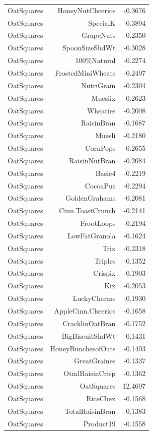 \begin{longtable}{@{}lrr@{}}
OatSquares & HoneyNutCheerios & -0.3676 \\
OatSquares & SpecialK & -0.3894 \\
OatSquares & GrapeNuts & -0.2350 \\
OatSquares & SpoonSizeShdWt & -0.3028 \\
OatSquares & 100\%Natural & -0.2274 \\
OatSquares & FrostedMiniWheats & -0.2497 \\
OatSquares & NutriGrain & -0.2304 \\
OatSquares & Mueslix & -0.2623 \\
OatSquares & Wheaties & -0.2008 \\
OatSquares & RaisinBran & -0.1687 \\
OatSquares & Muesli & -0.2180 \\
OatSquares & CornPops & -0.2655 \\
OatSquares & RaisinNutBran & -0.2084 \\
OatSquares & Basic4 & -0.2219 \\
OatSquares & CocoaPus & -0.2294 \\
OatSquares & GoldenGrahams & -0.2081 \\
OatSquares & Cinn.ToastCrunch & -0.2141 \\
OatSquares & FrootLoops & -0.2194 \\
OatSquares & LowFatGranola & -0.1624 \\
OatSquares & Trix & -0.2318 \\
OatSquares & Triples & -0.1352 \\
OatSquares & Crispix & -0.1903 \\
OatSquares & Kix & -0.2053 \\
OatSquares & LuckyCharms & -0.1930 \\
OatSquares & AppleCinn.Cheerios & -0.1658 \\
OatSquares & CracklinOatBran & -0.1752 \\
OatSquares & BigBiscuitShdWt & -0.1431 \\
OatSquares & HoneyBunchesofOats & -0.1403 \\
OatSquares & GreatGraines & -0.1337 \\
OatSquares & OtmlRaisinCrisp & -0.1362 \\
OatSquares & OatSquares & 12.4697 \\
OatSquares & RiceChex & -0.1568 \\
OatSquares & TotalRaisinBran & -0.1383 \\
OatSquares & Product19 & -0.1558 \\

\end{longtable}

